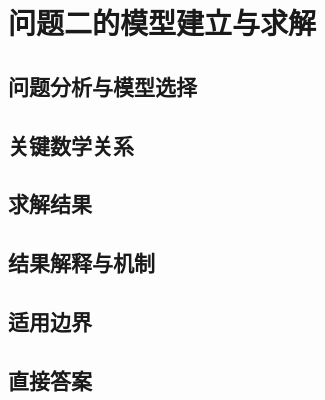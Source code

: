 \section{问题二的模型建立与求解}


\subsection{问题分析与模型选择}


\subsection{关键数学关系}


\subsection{求解结果}


\subsection{结果解释与机制}


\subsection{适用边界}


\subsection{直接答案}
